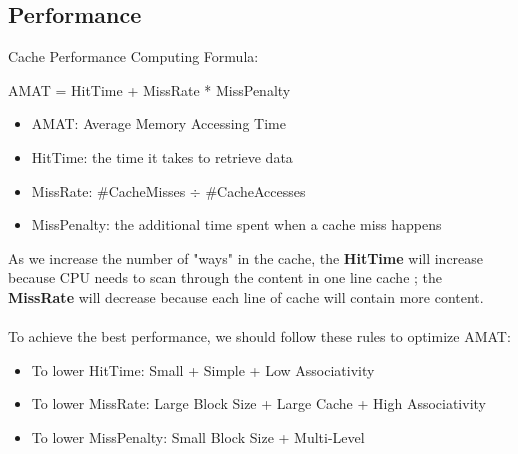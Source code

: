 \documentclass{article}
\begin{document}
\subsection{Performance}
Cache Performance Computing Formula:
\begin{center}
    AMAT = HitTime + MissRate * MissPenalty
\end{center}
\begin{itemize}
    \item AMAT: Average Memory Accessing Time
    \item HitTime: the time it takes to retrieve data
    \item MissRate: \#CacheMisses $\div$ \#CacheAccesses
    \item MissPenalty: the additional time spent when a cache miss happens
\end{itemize}
As we increase the number of "ways" in the cache, the \textbf{HitTime} will increase because CPU needs to scan through the content in one line cache ; the \textbf{MissRate} will decrease because each line of cache will contain more content.\\
 \\
To achieve the best performance, we should follow these rules to optimize AMAT:
\begin{itemize}
    \item To lower HitTime: Small + Simple + Low Associativity
    \item To lower MissRate: Large Block Size + Large Cache + High Associativity
    \item To lower MissPenalty: Small Block Size + Multi-Level
\end{itemize}
\end{document}
